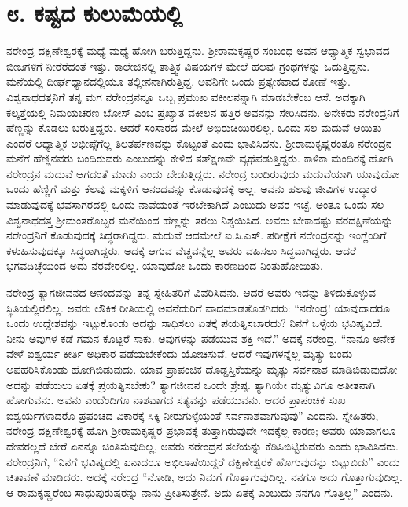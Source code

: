 
\chapter*{೮. ಕಷ್ಟದ ಕುಲುಮೆಯಲ್ಲಿ}

ನರೇಂದ್ರ ದಕ್ಷಿಣೇಶ್ವರಕ್ಕೆ ಮಧ್ಯೆ ಮಧ್ಯೆ ಹೋಗಿ ಬರುತ್ತಿದ್ದನು. ಶ‍್ರೀರಾಮಕೃಷ್ಣರ ಸಂಬಂಧ ಅವನ ಆಧ್ಯಾತ್ಮಿಕ ಸ್ವಭಾವದ ಬೀಜಗಳಿಗೆ ನೀರೆರೆದಂತೆ ಇತ್ತು. ಕಾಲೇಜಿನಲ್ಲಿ ತಾತ್ತ್ವಿಕ ವಿಷಯಗಳ ಮೇಲೆ ಹಲವು ಗ್ರಂಥಗಳನ್ನು ಓದುತ್ತಿದ್ದನು. ಮನೆಯಲ್ಲಿ ದೀರ್ಘಧ್ಯಾನದಲ್ಲಿಯೂ ತಲ್ಲೀನನಾಗಿರುತ್ತಿದ್ದ. ಅವನಿಗೇ ಒಂದು ಪ್ರತ್ಯೇಕವಾದ ಕೋಣೆ ಇತ್ತು. ವಿಶ್ವನಾಥದತ್ತನಿಗೆ ತನ್ನ ಮಗ ನರೇಂದ್ರನನ್ನೂ ಒಬ್ಬ ಪ್ರಮುಖ ವಕೀಲನನ್ನಾಗಿ ಮಾಡಬೇಕೆಂಬ ಆಸೆ. ಅದಕ್ಕಾಗಿ ಕಲ್ಕತ್ತೆಯಲ್ಲಿ ನಿಮಯಚರಣ ಬೋಸ್ ಎಂಬ ಪ್ರಖ್ಯಾತ ವಕೀಲನ ಹತ್ತಿರ ಅವನನ್ನು ಸೇರಿಸಿದನು. ಅನೇಕರು ನರೇಂದ್ರನಿಗೆ ಹೆಣ್ಣನ್ನು ಕೊಡಲು ಬರುತ್ತಿದ್ದರು. ಆದರೆ ಸಂಸಾರದ ಮೇಲೆ ಅಭಿರುಚಿಯಿರಲಿಲ್ಲ. ಒಂದು ಸಲ ಮದುವೆ ಆಯಿತು ಎಂದರೆ ಆಧ್ಯಾತ್ಮಿಕ ಅಭೀಪ್ಸೆಗೆಲ್ಲ ತಿಲತರ್ಪಣವನ್ನು ಕೊಟ್ಟಂತೆ ಎಂದು ಭಾವಿಸಿದನು. ಶ‍್ರೀರಾಮಕೃಷ್ಣರಂತೂ ನರೇಂದ್ರನ ಮನೆಗೆ ಹೆಣ್ಣಿನವರು ಬಂದಿರುವರು ಎಂಬುದನ್ನು ಕೇಳಿದ ತತ್‍ಕ್ಷಣವೇ ವ್ಯಥೆಪಡುತ್ತಿದ್ದರು. ಕಾಳಿಕಾ ಮಂದಿರಕ್ಕೆ ಹೋಗಿ ನರೇಂದ್ರನ ಮದುವೆ ಆಗದಂತೆ ಮಾಡು ಎಂದು ಬೇಡುತ್ತಿದ್ದರು. ನರೇಂದ್ರ ಬಂದಿರುವುದು ಮದುವೆಯಾಗಿ ಯಾವುದೋ ಒಂದು ಹೆಣ್ಣಿಗೆ ಮತ್ತು ಕೆಲವು ಮಕ್ಕಳಿಗೆ ಆನಂದವನ್ನು ಕೊಡುವುದಕ್ಕೆ ಅಲ್ಲ. ಅವನು ಹಲವು ಜೀವಿಗಳ ಉದ್ಧಾರ ಮಾಡುವುದಕ್ಕೆ ಭವಸಾಗರದಲ್ಲಿ ಒಂದು ನಾವೆಯಂತೆ ಇರಬೇಕಾಗಿದೆ ಎಂಬುದು ಅವರ ಇಚ್ಛೆ. ಅಂತೂ ಒಂದು ಸಲ ವಿಶ್ವನಾಥದತ್ತ ಶ‍್ರೀಮಂತರೊಬ್ಬರ ಮನೆಯಿಂದ ಹೆಣ್ಣನ್ನು ತರಲು ನಿಶ್ಚಯಿಸಿದ. ಅವರು ಬೇಕಾದಷ್ಟು ವರದಕ್ಷಿಣೆಯನ್ನು ನರೇಂದ್ರನಿಗೆ ಕೊಡುವುದಕ್ಕೆ ಸಿದ್ಧರಾಗಿದ್ದರು. ಮದುವೆ ಆದಮೇಲೆ ಐ.ಸಿ.ಎಸ್. ಪರೀಕ್ಷೆಗೆ ನರೇಂದ್ರನನ್ನು ಇಂಗ್ಲೆಂಡಿಗೆ ಕಳುಹಿಸುವುದಕ್ಕೂ ಸಿದ್ಧರಾಗಿದ್ದರು. ಅದಕ್ಕೆ ಆಗುವ ವೆಚ್ಚವನ್ನೆಲ್ಲ ಅವರು ವಹಿಸಲು ಸಿದ್ಧವಾಗಿದ್ದರು. ಆದರೆ ಭಗವದಿಚ್ಛೆಯಿಂದ ಅದು ನೆರವೇರಲಿಲ್ಲ. ಯಾವುದೋ ಒಂದು ಕಾರಣದಿಂದ ನಿಂತುಹೋಯಿತು.

ನರೇಂದ್ರ ತ್ಯಾಗಜೀವನದ ಆನಂದವನ್ನು ತನ್ನ ಸ್ನೇಹಿತರಿಗೆ ವಿವರಿಸಿದನು. ಆದರೆ ಅವರು ಇದನ್ನು ತಿಳಿದುಕೊಳ್ಳುವ ಸ್ಥಿತಿಯಲ್ಲಿರಲಿಲ್ಲ. ಅವರು ಲೌಕಿಕ ರೀತಿಯಲ್ಲಿ ಅವನೆದುರಿಗೆ ವಾದಮಾಡತೊಡಗಿದರು: “ನರೇಂದ್ರ! ಯಾವುದಾದರೂ ಒಂದು ಉದ್ದೇಶವನ್ನು ಇಟ್ಟುಕೊಂಡು ಅದನ್ನು ಸಾಧಿಸಲು ಏತಕ್ಕೆ ಪಯತ್ನಿಸಬಾರದು? ನಿನಗೆ ಒಳ್ಳೆಯ ಭವಿಷ್ಯವಿದೆ. ನೀನು ಅವುಗಳ ಕಡೆ ಗಮನ ಕೊಟ್ಟರೆ ಸಾಕು. ಅವುಗಳನ್ನು ಪಡೆಯುವ ಶಕ್ತಿ ಇದೆ.” ಅದಕ್ಕೆ ನರೇಂದ್ರ, “ನಾನೂ ಅನೇಕ ವೇಳೆ ಐಶ್ವರ್ಯ ಕೀರ್ತಿ ಅಧಿಕಾರ ಪಡೆಯಬೇಕೆಂದು ಯೋಚಿಸುವೆ. ಆದರೆ ಇವುಗಳನ್ನೆಲ್ಲ ಮೃತ್ಯು ಬಂದು ಅಪಹರಿಸಿಕೊಂಡು ಹೋಗಿಬಿಡುವುದು. ಯಾವ ಪ್ರಾಪಂಚಿಕ ದೊಡ್ಡಸ್ತಿಕೆಯನ್ನು ಮೃತ್ಯು ಸರ್ವನಾಶ ಮಾಡಿಬಿಡುವುದೋ ಅದನ್ನು ಪಡೆಯಲು ಏತಕ್ಕೆ ಪ್ರಯತ್ನಿಸಬೇಕು? ತ್ಯಾಗಜೀವನ ಒಂದೇ ಶ್ರೇಷ್ಠ. ತ್ಯಾಗಿಯೇ ಮೃತ್ಯುವಿಗೂ ಅತೀತನಾಗಿ ಹೋಗುವನು. ಅವನು ಎಂದೆಂದಿಗೂ ನಾಶವಾಗದ ಸತ್ಯವನ್ನು ಪಡೆಯುವನು. ಆದರೆ ಪ್ರಾಪಂಚಿಕ ಸುಖ ಐಶ್ವರ್ಯಗಳಾದರೊ ಪ್ರಪಂಚದ ವಿಕಾರಕ್ಕೆ ಸಿಕ್ಕಿ ನೀರುಗುಳ್ಳೆಯಂತೆ ಸರ್ವನಾಶವಾಗುವುವು” ಎಂದನು. ಸ್ನೇಹಿತರು, ನರೇಂದ್ರ ದಕ್ಷಿಣೇಶ್ವರಕ್ಕೆ ಹೊಗಿ ಶ‍್ರೀರಾಮಕೃಷ್ಣರ ಪ್ರಭಾವಕ್ಕೆ ತುತ್ತಾಗಿರುವುದೇ ಇದಕ್ಕೆಲ್ಲ ಕಾರಣ; ಅವರು ಯಾವಾಗಲೂ ದೇವರಲ್ಲದೆ ಬೇರೆ ಏನನ್ನೂ ಚಿಂತಿಸುವುದಿಲ್ಲ, ಅವರು ನರೇಂದ್ರನ ತಲೆಯನ್ನು ಕೆಡಿಸಿಬಿಟ್ಟಿರುವರು ಎಂದು ಭಾವಿಸಿದರು. ನರೇಂದ್ರನಿಗೆ, “ನಿನಗೆ ಭವಿಷ್ಯದಲ್ಲಿ ಏನಾದರೂ ಅಭಿಲಾಷೆಯಿದ್ದರೆ ದಕ್ಷಿಣೇಶ್ವರಕೆ ಹೊಗುವುದನ್ನು ಬಿಟ್ಟುಬಿಡು” ಎಂದು ಚಿತಾವಣೆ ಮಾಡಿದರು. ಅದಕ್ಕೆ ನರೇಂದ್ರ “ನೋಡಿ, ಅದು ನಿಮಗೆ ಗೊತ್ತಾಗುವುದಿಲ್ಲ. ನನಗೂ ಅದು ಗೊತ್ತಾಗುವುದಿಲ್ಲ. ಆ ರಾಮಕೃಷ್ಣರೆಂಬ ಸಾಧುಪುರುಷರನ್ನು ನಾನು ಪ್ರೀತಿಸುತ್ತೇನೆ. ಅದು ಏತಕ್ಕೆ ಎಂಬುದು ನನಗೂ ಗೊತ್ತಿಲ್ಲ” ಎಂದನು.

